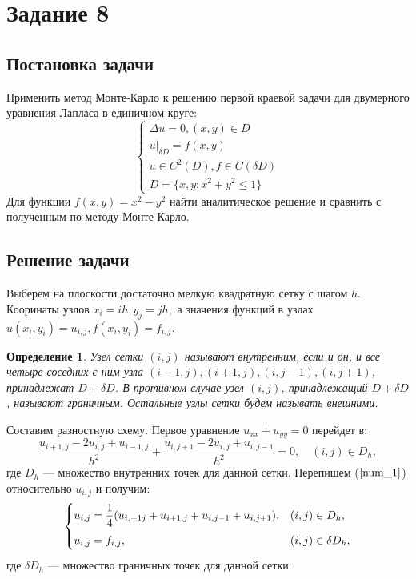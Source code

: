 \documentclass[oneside, final, 12pt]{article}
\newtheorem{definition}{Определение}
\begin{document}
\newpage
\section{Задание 8}

\subsection{Постановка задачи}
   	Применить метод Монте-Карло к решению первой краевой задачи для двумерного уравнения Лапласа 
   	в единичном круге:
   	$$
   		\begin{cases}
   		 	\Delta u = 0, (x,y) \in D \\
   		 	u|_{\delta D} = f(x,y) \\ 
   		 	u \in C^2 (D), f \in C(\delta D) \\
   		 	D = \{x,y: x^2+y^2 \leqslant 1\}	   		
		\end{cases}
   	$$
   	Для функции $f(x,y)= x^2-y^2$ найти аналитическое решение и сравнить с полученным по методу
   	Монте-Карло.
\subsection{Решение задачи}
	Выберем на плоскости достаточно мелкую квадратную сетку с шагом $h$. Кооринаты узлов $x_i = ih,y_j = jh,$
	а значения функций в узлах $u(x_i,y_i)= u_{i,j}, f(x_i,y_i)= f_{i,j} .$
	\begin{definition}
		Узел сетки $(i, j)$ называют внутренним, если и он, и все четыре соседних с ним узла
		$(i -1,j), (i +1, j), (i, j-1), (i, j+1)$, принадлежат 
		$D+\delta D$. В противном случае узел $(i, j)$, принадлежащий $D+\delta D$, называют граничным.
		Остальные узлы сетки будем называть внешними.
	\end{definition}
	\noindent
	Составим разностную схему. 
	Первое уравнение $u_{xx}+u_{yy}=0$ перейдет в:
	\begin{equation}
		\dfrac{u_{i+1,j}-2u_{i,j}+u_{i-1,j}}{h^2} + \dfrac{u_{i,j+1}-2u_{i,j}+u_{i,j-1}}{h^2} = 0, \quad (i,j) \in D_h,
		\label{num_1}
	\end{equation}
	где $D_h$ --- множество внутренних точек для данной сетки. \newline
	Перепишем ($\ref{num_1}$) относительно $u_{i,j}$ и получим:
	\begin{equation}
		\begin{cases}
			u_{i,j} = \dfrac{1}{4} (u_{i,-1j}+u_{i+1,j}+u_{i,j-1} +u_{i,j+1}), & (i,j) \in D_h,\vspace{2mm} \\
			u_{i,j} = f_{i,j}, & (i,j) \in \delta D_h,
		\end{cases} \label{num_sys}
	\end{equation}
	где $\delta D_h$ --- множество граничных точек для данной сетки.
	
\end{document}
